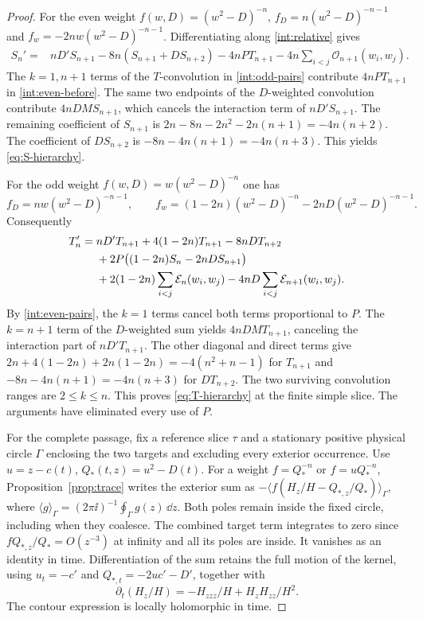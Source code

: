 \begin{proof}
For the even weight \(f(w,D)=(w^2-D)^{-n}\),
\(f_D=n(w^2-D)^{-n-1}\) and \(f_w=-2nw(w^2-D)^{-n-1}\).
Differentiating along \eqref{int:relative} gives
\begin{align}
 S_n'={}&nD'S_{n+1}-8n(S_{n+1}+DS_{n+2})
          -4nPT_{n+1}-4n\sum_{i<j}\mathcal O_{n+1}(w_i,w_j).
 \label{int:even-before}
\end{align}
The \(k=1,n+1\) terms of the \(T\)-convolution in
\eqref{int:odd-pairs} contribute \(4nPT_{n+1}\) in
\eqref{int:even-before}. The same two endpoints of the \(D\)-weighted
convolution contribute \(4nDMS_{n+1}\), which cancels the interaction
term of \(nD'S_{n+1}\). The remaining coefficient of \(S_{n+1}\)
is \(2n-8n-2n^2-2n(n+1)=-4n(n+2)\). The coefficient of
\(DS_{n+2}\) is \(-8n-4n(n+1)=-4n(n+3)\). This yields
\eqref{eq:S-hierarchy}.

For the odd weight \(f(w,D)=w(w^2-D)^{-n}\) one has
\[
 f_D=nw(w^2-D)^{-n-1},\qquad
 f_w=(1-2n)(w^2-D)^{-n}-2nD(w^2-D)^{-n-1}.
\]
Consequently
\begin{align}
 T_n'={}&nD'T_{n+1}+4(1-2n)T_{n+1}-8nDT_{n+2}\notag\\
       &+2P\bigl((1-2n)S_n-2nDS_{n+1}\bigr)\notag\\
       &+2(1-2n)\sum_{i<j}\mathcal E_n(w_i,w_j)
          -4nD\sum_{i<j}\mathcal E_{n+1}(w_i,w_j).
       \label{int:odd-before}
\end{align}
By \eqref{int:even-pairs}, the \(k=1\) terms cancel both terms
proportional to \(P\). The \(k=n+1\) term of the \(D\)-weighted
sum yields \(4nDMT_{n+1}\), canceling the interaction part of
\(nD'T_{n+1}\). The other diagonal and direct terms give
\(2n+4(1-2n)+2n(1-2n)=-4(n^2+n-1)\) for \(T_{n+1}\) and
\(-8n-4n(n+1)=-4n(n+3)\) for \(DT_{n+2}\).
The two surviving convolution ranges are \(2\leq k\leq n\).
This proves \eqref{eq:T-hierarchy} at the finite simple slice.
The arguments have eliminated every use of \(P\).

For the complete passage, fix a reference slice \(\tau\) and a
stationary positive physical circle \(\Gamma\) enclosing the two
targets and excluding every exterior occurrence. Use
\(u=z-c(t)\), \(Q_*(t,z)=u^2-D(t)\).
For a weight \(f=Q_*^{-n}\) or \(f=uQ_*^{-n}\),
Proposition~\ref{prop:trace} writes the exterior sum as
\(-\langle f(H_z/H-Q_{*,z}/Q_*)\rangle_\Gamma\), where
\(\langle g\rangle_\Gamma=(2\pi\ii)^{-1}\oint_\Gamma g(z)\,\dd z\).
Both poles remain inside the fixed circle, including when they
coalesce. The combined target term integrates to zero since
\(fQ_{*,z}/Q_*=O(z^{-3})\) at infinity and all its poles are inside.
It vanishes as an identity in time. Differentiation of the sum
retains the full motion of the kernel, using \(u_t=-c'\) and
\(Q_{*,t}=-2uc'-D'\), together with
\[
 \partial_t(H_z/H)=-H_{zzz}/H+H_zH_{zz}/H^2 .
\]
The contour expression is locally holomorphic in time.


\end{proof}
